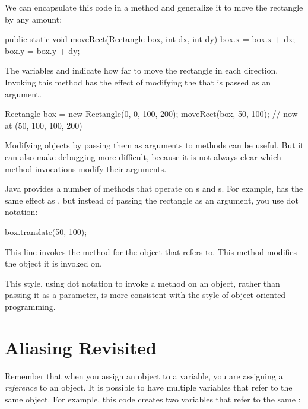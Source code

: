 
We can encapsulate this code in a method and generalize it to move the rectangle by any amount:

\begin{code}
public static void moveRect(Rectangle box, int dx, int dy) {
    box.x = box.x + dx;
    box.y = box.y + dy;
}
\end{code}

The variables  and  indicate how far to move the rectangle in each direction.
Invoking this method has the effect of modifying the  that is passed as an argument.

\begin{code}
Rectangle box = new Rectangle(0, 0, 100, 200);
moveRect(box, 50, 100);  // now at (50, 100, 100, 200)
\end{code}


Modifying objects by passing them as arguments to methods can be useful.
But it can also make debugging more difficult, because it is not always clear which method invocations modify their arguments.

Java provides a number of methods that operate on s and s.
For example,  has the same effect as , but instead of passing the rectangle as an argument, you use dot notation:

\begin{code}
box.translate(50, 100);
\end{code}

This line invokes the  method for the object that  refers to.
This method modifies the  object it is invoked on.


This style, using dot notation to invoke a method on an object, rather than passing it as a parameter, is more consistent with the style of object-oriented programming.


\section{Aliasing Revisited}
\label{aliasing}


Remember that when you assign an object to a variable, you are assigning a {\em reference} to an object.
It is possible to have multiple variables that refer to the same object.
For example, this code creates two variables that refer to the same :

